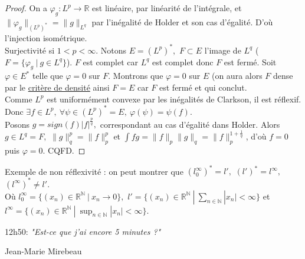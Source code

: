 \begin{proof}
    On a $\varphi _g:L^p\to \mathbb{R} $ est linéaire, par linéarité de l'intégrale, et $\|\varphi _g\|_{\left( L^p \right) ^*}=\|g\|_{L^q}$ par l'inégalité de Holder et son cas d'égalité. D'où l'injection isométrique.\\

Surjectivité si $1<p<\infty .$ Notons $E=\left( L^p \right) ^*,$ $F\subset E$ l'image de $L^q$  ($F=\{\varphi _g\ |\ g\in L^q\} $). $F$ est complet car $L^q$ est complet donc $F$ est fermé. Soit $\varphi \in E^*$ telle que $\varphi =0$ sur $F.$ Montrons que $\varphi =0$ sur $E$ (on aura alors $F$ dense par le \hyperlink{crit-densite}{critère de densité} ainsi $F=E$ car $F$ est fermé et qui conclut.\\
Comme $L^p$ est uniformément convexe par les inégalités de Clarkson, il est réflexif. Donc $\exists f\in L^p,\ \forall \psi\in \left( L^p \right) ^*=E,\ \varphi (\psi)=\psi(f). $ \\
Posons $g=sign(f)|f| ^{\frac{p}{q}},$ correspondant au cas d'égalité dans Holder. Alors $g\in L^q=F,$ $\|g\|_q^p=\|f\|_p^p$ et $\int fg=\|f\|_p\|g\|_q=\|f\|_p^{1+\frac{1}{q}}$, d'où $f=0$ puis $\varphi =0.$ CQFD.
\end{proof}
\begin{ex}
    Exemple de non réflexivité : on peut montrer que $\left( l_0^\infty  \right) ^*=l',$ $\left( l' \right) ^*=l^\infty ,$ $\left( l^\infty  \right) ^*\neq l'.$\\
    Où $l_0^\infty =\{(x_{n})\in \mathbb{R} ^\mathbb{N} \ |\ x_{n}\to 0\} ,$ $l'=\{\left( x_{n} \right) \in \mathbb{R} ^\mathbb{N} \ |\ \sum\limits_{n\in \mathbb{N} }^{} |x_n| <\infty \} $ et $l^\infty =\{(x_n)\in \mathbb{R} ^\mathbb{N} \ |\ \sup_{n\in \mathbb{N} }|x_n| <\infty \} $.
\end{ex}
\epigraph{12h50: \itshape "Est-ce que j'ai encore 5 minutes ?"}{Jean-Marie Mirebeau}
